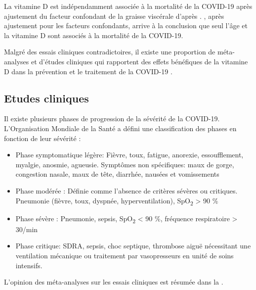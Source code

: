 \documentclass[
  a4paper,
  DIV=11,
  numbers=noendperiod,
  listof=totoc]{scrreprt}
\providecommand{\tightlist}{%
  \setlength{\itemsep}{0pt}\setlength{\parskip}{0pt}}\usepackage{longtable,booktabs,array}
\begin{document}
La vitamine D est indépendamment associée à la mortalité de la COVID-19
après ajustement du facteur confondant de la graisse viscérale d'après
\textcite{Vanegas-Cedillo.2022} . \textcite{Borsche.2021}, après
ajustement pour les facteurs confondants, arrive à la conclusion que
seul l'âge et la vitamine D sont associés à la mortalité de la COVID-19.

Malgré des essais cliniques contradictoires, il existe une proportion de
méta-analyses et d'études cliniques qui rapportent des effets bénéfiques
de la vitamine D dans la prévention et le traitement de la COVID-19
\autocite{Pal.2022}.

\subsection{Etudes cliniques}\label{etudes-cliniques}

Il existe plusieurs phases de progression de la sévérité de la COVID-19.
L'Organisation Mondiale de la Santé a défini une classification des
phases en fonction de leur sévérité \autocite{WHO.2023.org,Agarwal.2020}
:

\begin{itemize}
\tightlist
\item
  Phase symptomatique légère: Fièvre, toux, fatigue, anorexie,
  essoufflement, myalgie, anosmie, agueusie. Symptômes non spécifiques:
  maux de gorge, congestion nasale, maux de tête, diarrhée, nausées et
  vomissements
\item
  Phase modérée : Définie comme l'absence de critères sévères ou
  critiques. Pneumonie (fièvre, toux, dyspnée, hyperventilation),
  SpO\textsubscript{2} \textgreater{} 90 \%
\item
  Phase sévère : Pneumonie, sepsis, SpO\textsubscript{2} \textless{} 90
  \%, fréquence respiratoire \textgreater{} 30/min
\item
  Phase critique: \ac{SDRA}, sepsis, choc septique, thrombose aiguë
  nécessitant une ventilation mécanique ou traitement par vasopresseurs
  en unité de soins intensifs.
\end{itemize}

L'opinion des méta-analyses sur les essais cliniques est résumée dans la
.
\end{document}
